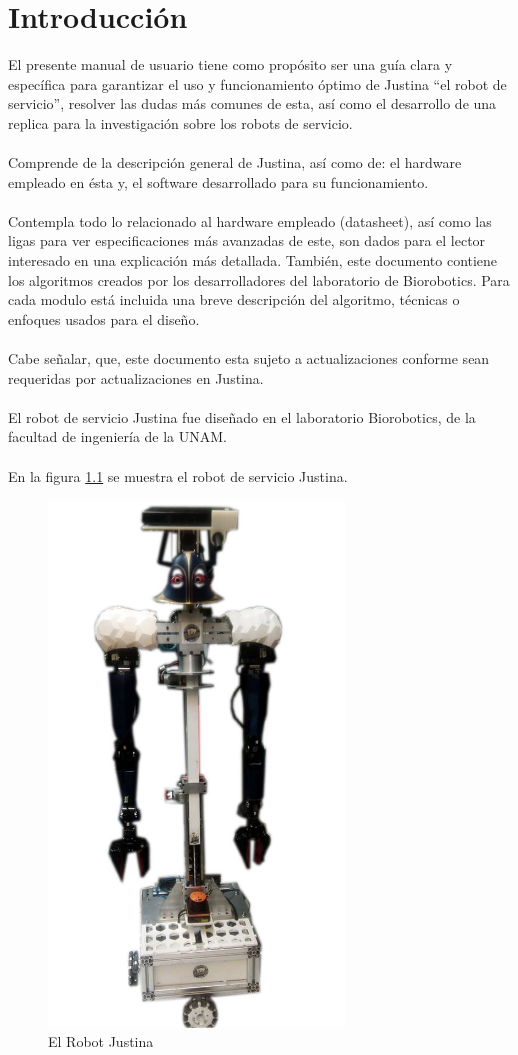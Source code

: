 \documentclass[user_manual.tex]{subfiles}
\begin{document}
\chapter{Introducción}

El presente manual de usuario tiene como propósito ser una guía clara y específica para garantizar el uso y funcionamiento
óptimo de Justina ``el robot de servicio'', resolver las dudas más comunes de esta, así como el desarrollo de una replica
para la investigación sobre los robots de servicio.\\
\\
Comprende de la descripción general de Justina, así como de: el hardware empleado en ésta y, el software desarrollado para su
funcionamiento.\\
\\
Contempla todo lo relacionado al hardware empleado (datasheet), así como las ligas para ver especificaciones más avanzadas de 
este, son dados para el lector interesado en una explicación más detallada. También, este documento contiene los algoritmos
creados por los desarrolladores del laboratorio de Biorobotics. Para cada modulo está incluida una breve descripción del algoritmo,
técnicas o enfoques usados para el diseño.\\
\\
Cabe señalar, que, este documento esta sujeto a actualizaciones conforme sean requeridas por actualizaciones en Justina.\\
\\
El robot de servicio Justina fue diseñado en el laboratorio Biorobotics, de la facultad de ingeniería de la UNAM.\\
\\
En la figura \ref{fig:introduction:Justina} se muestra el robot de servicio Justina.

\begin{figure}[H]
\centering
\includegraphics[width=0.7\textwidth]{Figures/Introduction/Justina.png}
\caption{El Robot Justina}
\label{fig:introduction:Justina}
\end{figure}
\pagebreak
\end{document}
